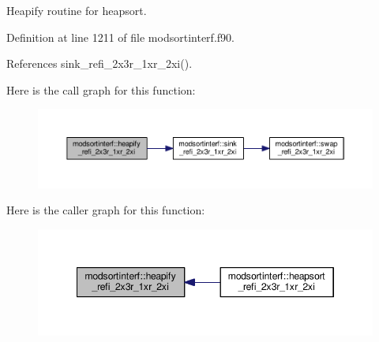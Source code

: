 Heapify routine for heapsort. 



Definition at line 1211 of file modsortinterf.\-f90.



References sink\-\_\-refi\-\_\-2x3r\-\_\-1xr\-\_\-2xi().



Here is the call graph for this function\-:\nopagebreak
\begin{figure}[H]
\begin{center}
\leavevmode
\includegraphics[width=350pt]{classmodsortinterf_a29a5315a689bd72fbc9a80e973c3f483_cgraph}
\end{center}
\end{figure}




Here is the caller graph for this function\-:\nopagebreak
\begin{figure}[H]
\begin{center}
\leavevmode
\includegraphics[width=346pt]{classmodsortinterf_a29a5315a689bd72fbc9a80e973c3f483_icgraph}
\end{center}
\end{figure}


